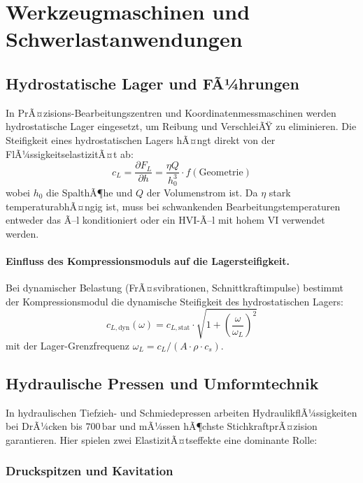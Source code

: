 ﻿\documentclass[a4paper,12pt]{scrreprt}
\theoremstyle{definition}
\begin{document}
\section{Werkzeugmaschinen und Schwerlastanwendungen}

\subsection{Hydrostatische Lager und FÃ¼hrungen}

In PrÃ¤zisions-Bearbeitungszentren und Koordinatenmessmaschinen werden
hydrostatische Lager eingesetzt, um Reibung und VerschleiÃŸ zu eliminieren.
Die Steifigkeit eines hydrostatischen Lagers hÃ¤ngt direkt von der
FlÃ¼ssigkeitselastizitÃ¤t ab:
\begin{equation}
  c_L = \frac{\partial F_L}{\partial h} = \frac{\eta Q}{h_0^3} \cdot f(\mathrm{Geometrie})
  \label{eq:lager_steifigkeit}
\end{equation}
wobei $h_0$ die SpalthÃ¶he und $Q$ der Volumenstrom ist. Da $\eta$ stark
temperaturabhÃ¤ngig ist, muss bei schwankenden Bearbeitungstemperaturen
entweder das Ã–l konditioniert oder ein HVI-Ã–l mit hohem VI verwendet werden.

\paragraph{Einfluss des Kompressionsmoduls auf die Lagersteifigkeit.}
Bei dynamischer Belastung (FrÃ¤svibrationen, Schnittkraftimpulse) bestimmt
der Kompressionsmodul die dynamische Steifigkeit des hydrostatischen Lagers:
\begin{equation}
  c_{L,\mathrm{dyn}}(\omega) = c_{L,\mathrm{stat}} \cdot
    \sqrt{1 + \left(\frac{\omega}{\omega_L}\right)^2}
  \label{eq:lager_dyn_steifigkeit}
\end{equation}
mit der Lager-Grenzfrequenz $\omega_L = c_L / (A \cdot \rho \cdot c_s)$.

\subsection{Hydraulische Pressen und Umformtechnik}

In hydraulischen Tiefzieh- und Schmiedepressen arbeiten HydraulikflÃ¼ssigkeiten
bei DrÃ¼cken bis $700\,\mathrm{bar}$ und mÃ¼ssen hÃ¶chste StichkraftprÃ¤zision
garantieren. Hier spielen zwei ElastizitÃ¤tseffekte eine dominante Rolle:

\subsubsection{Druckspitzen und Kavitation}
\end{document}
